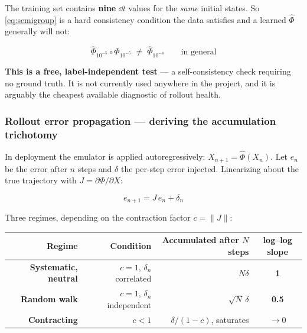 The training set contains \textbf{nine} $\dd t$ values for the \emph{same}
initial states. So \eqref{eq:semigroup} is a hard consistency condition the data
satisfies and a learned $\hat\Phi$ generally will not:

\begin{equation*}
\hat{\Phi}_{10^{-5}} \circ \hat{\Phi}_{10^{-5}} \;\neq\;
\hat{\Phi}_{10^{-4}} \qquad \text{in general}
\end{equation*}

\begin{aside}
\textbf{This is a free, label-independent test} --- a self-consistency check
requiring no ground truth. It is not currently used anywhere in the project, and
it is arguably the cheapest available diagnostic of rollout health.
\end{aside}

\subsubsection{Rollout error propagation --- deriving the accumulation trichotomy}
\label{sec:accumulationtrichotomy}

In deployment the emulator is applied autoregressively:
$X_{n+1} = \hat\Phi(X_n)$. Let $e_n$ be the error after $n$ steps and $\delta$
the per-step error injected. Linearizing about the true trajectory with
$J = \partial\Phi/\partial X$:

\begin{equation}
e_{n+1} = J\,e_n + \delta_n
\label{eq:rollout-recursion}
\end{equation}

Three regimes, depending on the contraction factor $c = \|J\|$:

\begin{center}
\small
\begin{tabularx}{\textwidth}{@{}R{0.911} R{1.018} R{1.071} c@{}}
\toprule
\textbf{Regime} & \textbf{Condition} &
\textbf{Accumulated after $N$ steps} & \textbf{log--log slope} \\
\midrule
\textbf{Systematic, neutral} & $c = 1$, $\delta_n$ correlated &
  $N\delta$ & \textbf{1} \\
\textbf{Random walk} & $c = 1$, $\delta_n$ independent &
  $\sqrt{N}\,\delta$ & \textbf{0.5} \\
\textbf{Contracting} & $c < 1$ &
  $\delta/(1-c)$, saturates & \textbf{$\to 0$} \\
\bottomrule
\end{tabularx}
\end{center}

